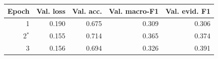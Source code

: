 \begin{tabular}{rrrrr}\toprule
Epoch & Val. loss & Val. acc. & Val. macro-F1 & Val. evid. F1 \\\midrule
1 & 0.190 & 0.675 & 0.309 & 0.306 \\
2$^*$ & 0.155 & 0.714 & 0.365 & 0.374 \\
3 & 0.156 & 0.694 & 0.326 & 0.391 \\
\bottomrule\end{tabular}
